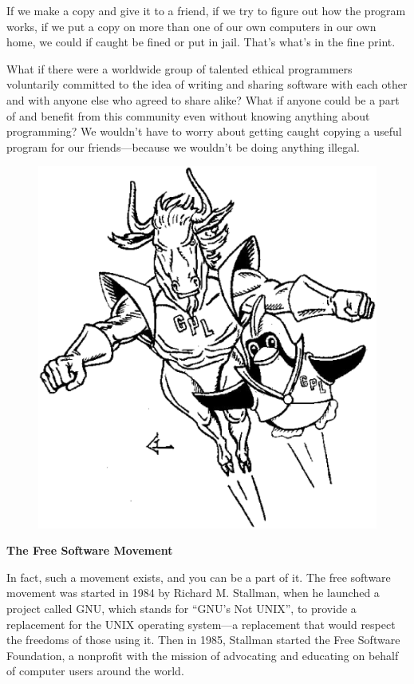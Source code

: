 \documentclass[twoside,12pt]{article}
\begin{document}
If we make a copy and give it to a friend, if we try to figure out how the
program works, if we put a copy on more than one of our own computers in our
own home, we could if caught be fined or put in jail. That's what's in the fine
print.

What if there were a worldwide group of talented ethical programmers
voluntarily committed to the idea of writing and sharing software with each
other and with anyone else who agreed to share alike? What if anyone could be a
part of and benefit from this community even without knowing anything about
programming? We wouldn't have to worry about getting caught copying a useful
program for our friends---because we wouldn't be doing anything illegal.

\begin{figure}
 \begin{center}
   \includegraphics[scale=0.23]{dynamic-duo-bw.eps}
 \end{center}
\end{figure}

\begin{center}
{\Large\bf The Free Software Movement}
\end{center}

In fact, such a movement exists, and you can be a part of it. The free software
movement was started in 1984 by Richard M. Stallman, when he launched a project
called GNU, which stands for ``GNU's Not UNIX'', to provide a replacement for
the UNIX operating system---a replacement that would respect the freedoms of
those using it. Then in 1985, Stallman started the Free Software Foundation, a
nonprofit with the mission of advocating and educating on behalf of computer
users around the world.
\end{document}
